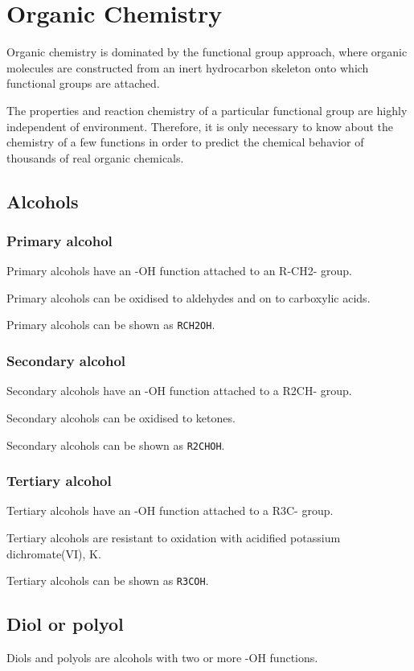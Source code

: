 \documentclass[oneside]{book}
\begin{document}
\chapter{Organic Chemistry}
Organic chemistry is dominated by the functional group approach, where organic
molecules are constructed from an inert hydrocarbon skeleton onto which
functional groups are attached.

The properties and reaction chemistry of a particular functional group are
highly independent of environment. Therefore, it is only necessary to know about
the chemistry of a few functions in order to predict the chemical behavior of
thousands of real organic chemicals.

\section{Alcohols}
\subsection{Primary alcohol}
Primary alcohols have an -OH function attached to an R-CH2- group.

Primary alcohols can be oxidised to aldehydes and on to carboxylic acids.

Primary alcohols can be shown as \texttt{RCH2OH}.

\subsection{Secondary alcohol}
Secondary alcohols have an -OH function attached to a R2CH- group.

Secondary alcohols can be oxidised to ketones.

Secondary alcohols can be shown as \texttt{R2CHOH}.

\subsection{Tertiary alcohol}
Tertiary alcohols have an -OH function attached to a R3C- group.

Tertiary alcohols are resistant to oxidation with acidified potassium
dichromate(VI), K.

Tertiary alcohols can be shown as \texttt{R3COH}.

\section{Diol or polyol}
Diols and polyols are alcohols with two or more -OH functions.
\end{document}
